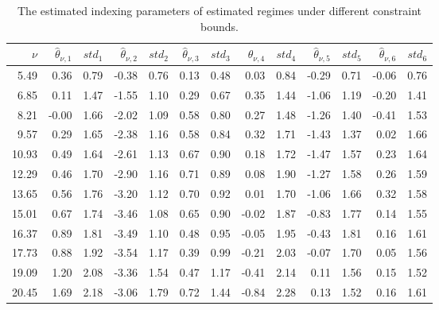\begin{table}[!htbp]
\caption{The estimated indexing parameters of estimated regimes under different constraint bounds.}
	\centering
\begin{tabular}{rrrrrrrrrrrrr}\hline 
	$\nu$ & $\widehat{\theta}_{\nu,1}$ & $std_1$ & $\widehat{\theta}_{\nu,2}$ & $std_2$ & $\widehat{\theta}_{\nu,3}$ & $std_3$ & $\widehat{\theta}_{\nu,4}$ & $std_4$ &  $\widehat{\theta}_{\nu,5}$ & $std_5$ & $\widehat{\theta}_{\nu,6}$ & $std_6$ \\ \hline 
	5.49 &     0.36 &     0.79 &    -0.38 &     0.76  &     0.13 &     0.48 &     0.03 &     0.84 &    -0.29 &     0.71  &    -0.06 &     0.76 \\ 
	6.85 &     0.11 &     1.47 &    -1.55 &     1.10  &     0.29 &     0.67 &     0.35 &     1.44 &    -1.06 &     1.19  &    -0.20 &     1.41 \\ 
	8.21 &    -0.00 &     1.66 &    -2.02 &     1.09  &     0.58 &     0.80 &     0.27 &     1.48 &    -1.26 &     1.40  &    -0.41 &     1.53 \\ 
	9.57 &     0.29 &     1.65 &    -2.38 &     1.16  &     0.58 &     0.84 &     0.32 &     1.71 &    -1.43 &     1.37  &     0.02 &     1.66 \\ 
	10.93 &     0.49 &     1.64 &    -2.61 &     1.13  &     0.67 &     0.90 &     0.18 &     1.72 &    -1.47 &     1.57  &     0.23 &     1.64 \\ 
	12.29 &     0.46 &     1.70 &    -2.90 &     1.16  &     0.71 &     0.89 &     0.08 &     1.90 &    -1.27 &     1.58  &     0.26 &     1.59 \\ 
	13.65 &     0.56 &     1.76 &    -3.20 &     1.12  &     0.70 &     0.92 &     0.01 &     1.70 &    -1.06 &     1.66  &     0.32 &     1.58 \\ 
	15.01 &     0.67 &     1.74 &    -3.46 &     1.08  &     0.65 &     0.90 &    -0.02 &     1.87 &    -0.83 &     1.77  &     0.14 &     1.55 \\ 
	16.37 &     0.89 &     1.81 &    -3.49 &     1.10  &     0.48 &     0.95 &    -0.05 &     1.95 &    -0.43 &     1.81  &     0.16 &     1.61 \\ 
	17.73 &     0.88 &     1.92 &    -3.54 &     1.17  &     0.39 &     0.99 &    -0.21 &     2.03 &    -0.07 &     1.70  &     0.05 &     1.56 \\ 
	19.09 &     1.20 &     2.08 &    -3.36 &     1.54  &     0.47 &     1.17 &    -0.41 &     2.14 &     0.11 &     1.56  &     0.15 &     1.52 \\ 
	20.45 &     1.69 &     2.18 &    -3.06 &     1.79  &     0.72 &     1.44 &    -0.84 &     2.28 &     0.13 &     1.52  &     0.16 &     1.61 \\ 

\end{tabular}
\end{table}
